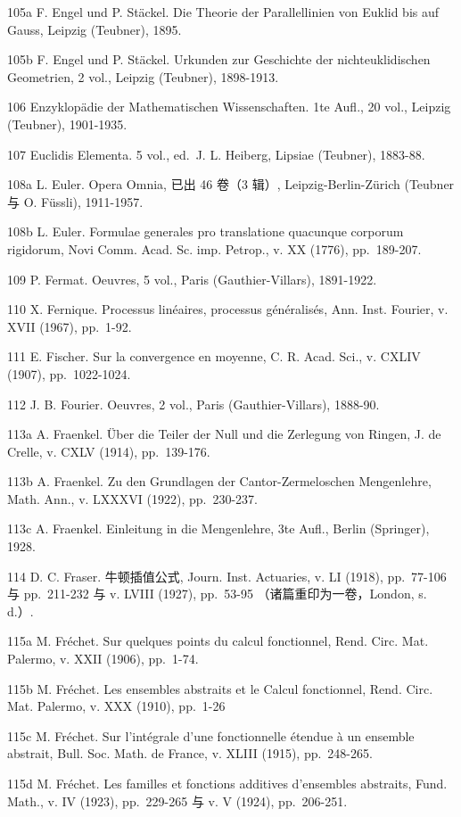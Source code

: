 105a F. Engel und P. Stäckel. Die Theorie der Parallellinien von Euklid bis auf Gauss, Leipzig (Teubner), 1895.

105b F. Engel und P. Stäckel. Urkunden zur Geschichte der nichteuklidischen Geometrien, 2 vol., Leipzig (Teubner), 1898-1913.

106 Enzyklopädie der Mathematischen Wissenschaften. 1te Aufl., 20 vol., Leipzig (Teubner), 1901-1935.

107 Euclidis Elementa. 5 vol., ed.~J. L. Heiberg, Lipsiae (Teubner), 1883-88.

108a L. Euler. Opera Omnia, 已出 46 卷（3 辑）, Leipzig-Berlin-Zürich (Teubner 与 O. Füssli), 1911-1957.

108b L. Euler. Formulae generales pro translatione quacunque corporum rigidorum, Novi Comm. Acad. Sc. imp. Petrop., v. XX (1776), pp.~189-207.

109 P. Fermat. Oeuvres, 5 vol., Paris (Gauthier-Villars), 1891-1922.

110 X. Fernique. Processus linéaires, processus généralisés, Ann. Inst. Fourier, v. XVII (1967), pp.~1-92.

111 E. Fischer. Sur la convergence en moyenne, C. R. Acad. Sci., v. CXLIV (1907), pp.~1022-1024.

112 J. B. Fourier. Oeuvres, 2 vol., Paris (Gauthier-Villars), 1888-90.

113a A. Fraenkel. Über die Teiler der Null und die Zerlegung von Ringen, J. de Crelle, v. CXLV (1914), pp.~139-176.

113b A. Fraenkel. Zu den Grundlagen der Cantor-Zermeloschen Mengenlehre, Math. Ann., v. LXXXVI (1922), pp.~230-237.

113c A. Fraenkel. Einleitung in die Mengenlehre, 3te Aufl., Berlin (Springer), 1928.

114 D. C. Fraser. 牛顿插值公式, Journ. Inst. Actuaries, v. LI (1918), pp.~77-106 与 pp.~211-232 与 v. LVIII (1927), pp.~53-95 （诸篇重印为一卷，London, s. d.）.

115a M. Fréchet. Sur quelques points du calcul fonctionnel, Rend. Circ. Mat. Palermo, v. XXII (1906), pp.~1-74.

115b M. Fréchet. Les ensembles abstraits et le Calcul fonctionnel, Rend. Circ. Mat. Palermo, v. XXX (1910), pp.~1-26

115c M. Fréchet. Sur l'intégrale d'une fonctionnelle étendue à un ensemble abstrait, Bull. Soc. Math. de France, v. XLIII (1915), pp.~248-265.

115d M. Fréchet. Les familles et fonctions additives d'ensembles abstraits, Fund. Math., v. IV (1923), pp.~229-265 与 v. V (1924), pp.~206-251.

